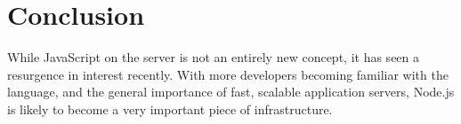 \section{\label{sec:con}Conclusion}

While JavaScript on the server is not an entirely new concept, it has seen a resurgence in interest recently. With more developers becoming familiar with the language, and the general importance of fast, scalable application servers, Node.js is likely to become a very important piece of infrastructure.
